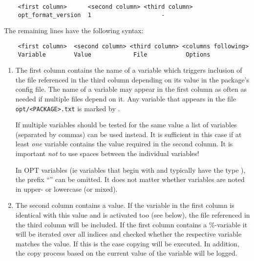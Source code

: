 \begin{example}
\begin{verbatim}
    <first column>      <second column> <third column>
    opt_format_version  1                    -
\end{verbatim}
\end{example}

    The remaining lines have the following syntax:

\begin{example}
\begin{verbatim}
    <first column>  <second column> <third column> <columns following>
    Variable        Value            File           Options
\end{verbatim}
\end{example}

    \begin{enumerate}
    \item
        The first column contains the name of a variable which triggers
        inclusion of the file referenced in the third column depending on
        its value in the package's config file. The name of a variable may
        appear in the first column as often as needed if multiple files depend
        on it. Any variable that appears in the file \texttt{opt/<PACKAGE>.txt}
        is marked by .

        If multiple variables should be tested for the same value a list of
        variables (separated by commas) can be used instead. It is sufficient
        in this case if at least \emph{one} variable contains the value required
        in the second column. It is important \emph{not} to use spaces between
        the individual variables!

        In OPT variables (ie variables that begin with  and typically have
        the type ), the prefix ``'' can be omitted. It does not
        matter whether variables are noted in upper- or lowercase (or mixed).

      \item The second column contains a value. If the variable in the first column
	is identical with this value and is activated too (see below), the file referenced
	in the third column will be included. If the first column contains a \%-variable
        it will be iterated over all indices and checked whether the respective
        variable matches the value. If this is the case copying will be executed.
        In addition, the copy process based on the current value of the variable
        will be logged.


\end{enumerate}

